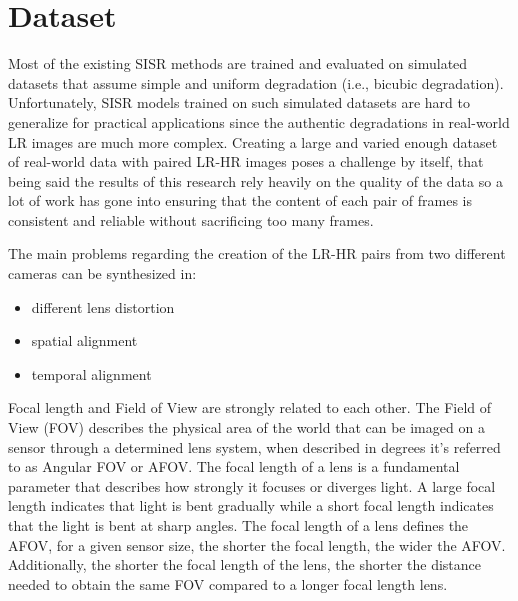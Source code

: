\newpage
\chapter{Dataset}
\label{cha:dataset}

Most of the existing SISR methods are trained and evaluated on simulated datasets that assume simple and uniform degradation (i.e., bicubic degradation). Unfortunately, SISR models trained on such simulated datasets are hard to generalize for practical applications since the authentic degradations in real-world LR images are much more complex\cite{cai2019realworld}. Creating a large and varied enough dataset of real-world data with paired LR-HR images poses a challenge by itself, that being said the results of this research rely heavily on the quality of the data so a lot of work has gone into ensuring that the content of each pair of frames is consistent and reliable without sacrificing too many frames.

The main problems regarding the creation of the LR-HR pairs from two different cameras can be synthesized in:
\begin{itemize}
  \item different lens distortion
  \item spatial alignment
  \item temporal alignment
\end{itemize}

Focal length and Field of View are strongly related to each other. The Field of View (FOV) describes the physical area of the world that can be imaged on a sensor through a determined lens system, when described in degrees it's referred to as Angular FOV or AFOV.
The focal length of a lens is a fundamental parameter that describes how strongly it focuses or diverges light. A large focal length indicates that light is bent gradually while a short focal length indicates that the light is bent at sharp angles.
The focal length of a lens defines the AFOV, for a given sensor size, the shorter the focal length, the wider the AFOV. Additionally, the shorter the focal length of the lens, the shorter the distance needed to obtain the same FOV compared to a longer focal length lens\cite{flength}.


